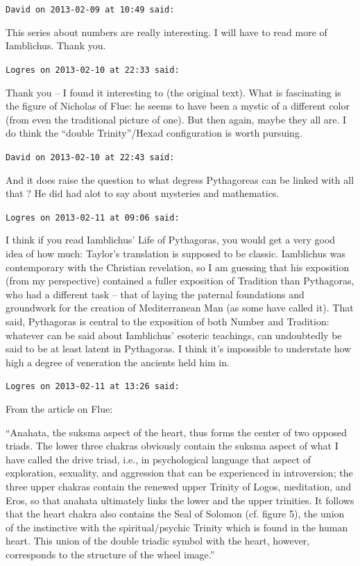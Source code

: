 \begin{footnotesize}
\begin{sffamily}
\texttt{David on 2013-02-09 at 10:49 said:}

This series about numbers are really interesting. I will have to read more of Iamblichus. Thank you.

\hfill

\texttt{Logres on 2013-02-10 at 22:33 said:}

Thank you -- I found it interesting to (the original text). What is fascinating is the figure of Nicholas of Flue: he seems to have been a mystic of a different color (from even the traditional picture of one). But then again, maybe they all are. I do think the ``double Trinity''/Hexad configuration is worth pursuing.

\hfill

\texttt{David on 2013-02-10 at 22:43 said:}

And it does raise the question to what degress Pythagoreas can be linked with all that ? He did had alot to say about mysteries and mathematics.

\hfill

\texttt{Logres on 2013-02-11 at 09:06 said:}

I think if you read Iamblichus' Life of Pythagoras, you would get a very good idea of how much: Taylor's translation is supposed to be classic. Iamblichus was contemporary with the Christian revelation, so I am guessing that his exposition (from my perspective) contained a fuller exposition of Tradition than Pythagoras, who had a different task -- that of laying the paternal foundations and groundwork for the creation of Mediterranean Man (as some have called it). That said, Pythagoras is central to the exposition of both Number and Tradition: whatever can be said about Iamblichus' esoteric teachings, can undoubtedly be said to be at least latent in Pythagoras. I think it's impossible to understate how high a degree of veneration the ancients held him in.

\hfill

\texttt{Logres on 2013-02-11 at 13:26 said:}

From the article on Flue:

``Anahata, the suksma aspect of the heart, thus forms the center of two opposed triads. The lower three chakras obviously contain the suksma aspect of what I have called the drive triad, i.e., in psychological language that aspect of exploration, sexuality, and aggression that can be experienced in introversion; the three upper chakras contain the renewed upper Trinity of Logos, meditation, and Eros, so that anahata ultimately links the lower and the upper trinities. It follows that the heart chakra also contains the Seal of Solomon (cf. figure 5), the union of the instinctive with the spiritual/psychic Trinity which is found in the human heart. This union of the double triadic symbol with the heart, however, corresponds to the structure of the wheel image.''


\end{sffamily}
\end{footnotesize}
